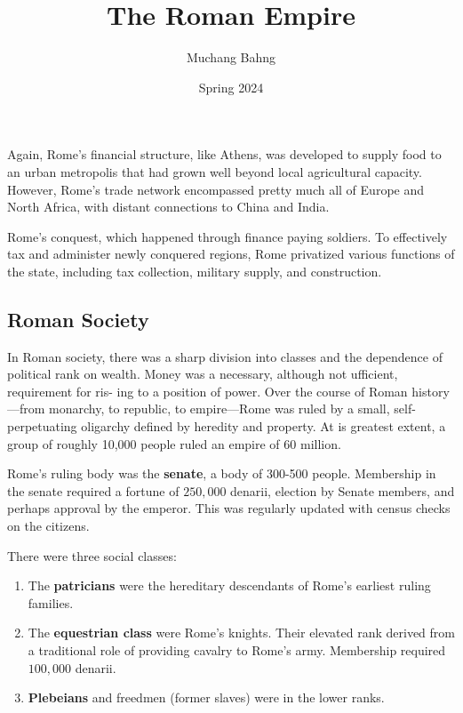 \documentclass{article}
\begin{document}
\title{The Roman Empire}
\author{Muchang Bahng}
\date{Spring 2024}

\maketitle
\tableofcontents
\pagebreak

\section{} 
  
  Again, Rome's financial structure, like Athens, was developed to supply food to an urban metropolis that had grown well beyond local agricultural capacity. However, Rome's trade network encompassed pretty much all of Europe and North Africa, with distant connections to China and India. 

  Rome's conquest, which happened through finance paying soldiers. To effectively tax and administer newly conquered regions, Rome privatized various functions of the state, including tax collection, military supply, and construction.  

  \subsection{Roman Society}

    In Roman society, there was a sharp division into classes and the dependence of political rank on wealth. Money was a necessary, although not ufficient, requirement for ris- ing to a position of power. Over the course of Roman history—from monarchy, to republic, to empire—Rome was ruled by a small, self- perpetuating oligarchy defined by heredity and property. At is greatest extent, a group of roughly 10,000 people ruled an empire of 60 million. 

    \begin{politics}[Senate]
      Rome's ruling body was the \textbf{senate}, a body of 300-500 people. Membership in the senate required a fortune of $250,000$ denarii, election by Senate members, and perhaps approval by the emperor. This was regularly updated with census checks on the citizens. 
    \end{politics}

    \begin{society}
      There were three social classes:
      \begin{enumerate}
        \item The \textbf{patricians} were the hereditary descendants of Rome's earliest ruling families. 
        \item The \textbf{equestrian class} were Rome's knights. Their elevated rank derived from a traditional role of providing cavalry to Rome's army. Membership required $100,000$ denarii. 
        \item \textbf{Plebeians} and freedmen (former slaves) were in the lower ranks. 
      \end{enumerate}
    \end{society}
\end{document}
